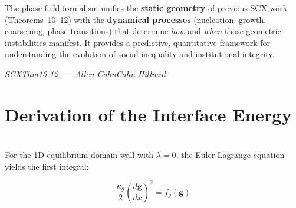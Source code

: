 \documentclass[12pt,a4paper]{article}
\theoremstyle{plain}
\theoremstyle{definition}
\newcommand{\gf}{\mathbf{g}}          %
\newcommand{\cn}[1]{\textcolor{scxgray}{\textit{#1}}}
\begin{document}
The phase field formalism unifies the \textbf{static geometry} of previous SCX
work (Theorems~10--12) with the \textbf{dynamical processes} (nucleation, growth,
coarsening, phase transitions) that determine \textit{how} and \textit{when}
those geometric instabilities manifest. It provides a predictive, quantitative
framework for understanding the evolution of social inequality and institutional
integrity.

\begin{center}
\end{center}

\bigskip
\noindent
\cn{SCXThm10-12——Allen-CahnCahn-Hilliard}

\appendix

\section{Derivation of the Interface Energy}
\section*{}

For the 1D equilibrium domain wall with $\lambda=0$, the Euler-Lagrange
equation yields the first integral:

\begin{equation}
    \frac{\kappa_g}{2}\left(\frac{d\gf}{dx}\right)^2 = f_g(\gf)
    \label{eq:first_integral_app}
\end{equation}
\end{document}
